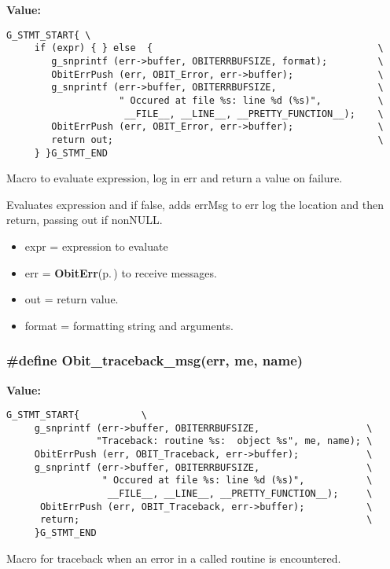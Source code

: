 {\bf Value:}

\footnotesize\begin{verbatim}G_STMT_START{ \
     if (expr) { } else  {                                        \
        g_snprintf (err->buffer, OBITERRBUFSIZE, format);         \
        ObitErrPush (err, OBIT_Error, err->buffer);               \
        g_snprintf (err->buffer, OBITERRBUFSIZE,                  \
                    " Occured at file %s: line %d (%s)",          \
                     __FILE__, __LINE__, __PRETTY_FUNCTION__);    \
        ObitErrPush (err, OBIT_Error, err->buffer);               \
        return out;                                               \
     } }G_STMT_END
\end{verbatim}\normalsize 
Macro to evaluate expression, log in err and return a value on failure. 

Evaluates expression and if false, adds err\-Msg to err log the location and then return, passing out if non\-NULL. \begin{itemize}
\item expr = expression to evaluate \item err = {\bf Obit\-Err}{\rm (p.\,\pageref{structObitErr})} to receive messages. \item out = return value. \item format = formatting string and arguments. \end{itemize}
\subsubsection{\setlength{\rightskip}{0pt plus 5cm}\#define Obit\_\-traceback\_\-msg(err, me, name)}\label{ObitErr_8h_a5}


{\bf Value:}

\footnotesize\begin{verbatim}G_STMT_START{           \
     g_snprintf (err->buffer, OBITERRBUFSIZE,                   \
                "Traceback: routine %s:  object %s", me, name); \
     ObitErrPush (err, OBIT_Traceback, err->buffer);            \
     g_snprintf (err->buffer, OBITERRBUFSIZE,                   \
                 " Occured at file %s: line %d (%s)",           \
                  __FILE__, __LINE__, __PRETTY_FUNCTION__);     \
      ObitErrPush (err, OBIT_Traceback, err->buffer);           \
      return;                                                   \
     }G_STMT_END
\end{verbatim}\normalsize 
Macro for traceback when an error in a called routine is encountered. 

